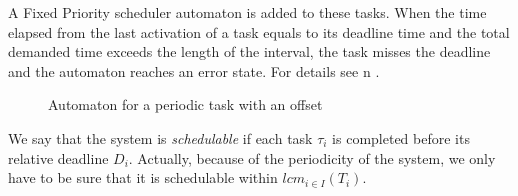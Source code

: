 \documentclass{article}
\begin{document}
A Fixed Priority scheduler automaton is added to these tasks. When the time
elapsed from the last activation of a task equals to its deadline
time and the total demanded time exceeds the length of
the interval, the task misses the deadline and the automaton reaches an error state. For details see n \cite{cpr08}.


\begin{figure}[!ht]
\centering
\label{fig:cyclic_task}
%    
 \caption{Automaton for a periodic task with an offset}
\end{figure}
We say that the system is \emph{schedulable} if each task $\tau_i$ is completed before its relative deadline $D_i$. Actually, because of the periodicity
of the system, we only have to be sure that it is schedulable within $lcm_{i\in I}(T_i)$.
% 
% 
\end{document}
